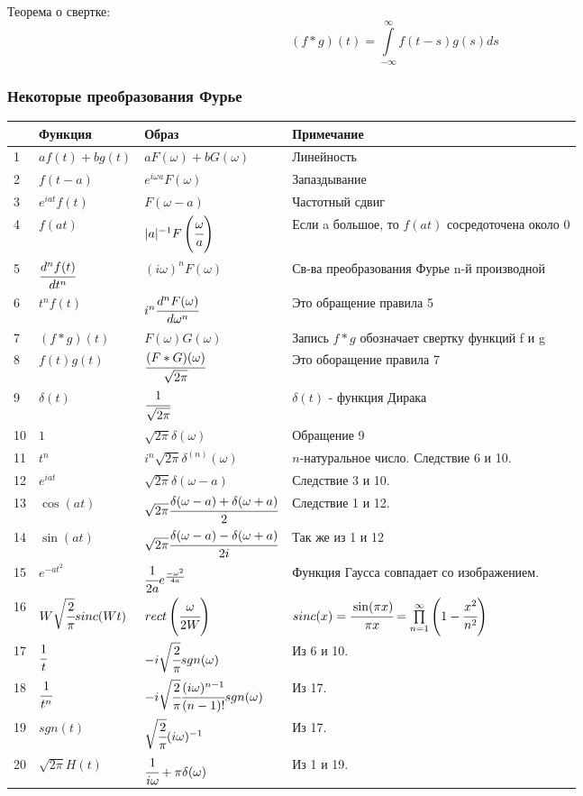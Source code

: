 \documentclass[12pt, a6paper]{extarticle}
\begin{document}
Теорема о свертке:
$$ (f * g)(t) = \int\limits_{-\infty}^{\infty}{ f(t-s)g(s) ds} $$

\subsubsection{Некоторые преобразования Фурье}
\begin{tabular}[c]{|p{0.3cm}|p{2.8cm}|p{4.5cm}|p{8cm}|}
\hline
 &Функция & Образ & Примечание \\ \hline
1 & $ a f(t) + b g(t)$ & $aF(\omega)+bG(\omega)$ & Линейность \\ \hline
2 & $ f(t-a)$ & $e^{i\omega a}F(\omega)$ & Запаздывание \\ \hline
3 & $ e^{iat}f(t)$ & $F(\omega-a)$ & Частотный сдвиг \\ \hline
4 & $ f(at)$ & $ |a|^{-1}F\left( \cfrac{\omega}{a} \right) $ & Если a большое, то $f(at)$ сосредоточена около 0 \\ \hline
5 & $ \cfrac{d^nf(t)}{dt^n} $ & $ (i\omega)^nF(\omega) $ & Св-ва преобразования Фурье n-й производной \\ \hline
6 & $ t^n f(t) $ & $ i^n \cfrac{d^nF(\omega)}{d\omega^n} $ & Это обращение правила 5 \\ \hline
7 & $ (f * g)(t)$ & $ F(\omega)G(\omega) $ & Запись $f*g$ обозначает свертку функций f и g \\ \hline
8 & $ f(t)g(t)$ & $ \cfrac{(F * G)(\omega)}{\sqrt{2\pi}} $ & Это оборащение правила 7 \\ \hline
9 & $ \delta(t) $ & $ \cfrac{1}{\sqrt{2\pi}} $ & $ \delta(t) $ - функция Дирака \\ \hline
10 & $ 1 $ & $ \sqrt{2\pi}\delta(\omega) $ & Обращение 9 \\ \hline
11 & $ t^n $ & $ i^n \sqrt{2\pi} \delta^{(n)}(\omega) $ & $n$-натуральное число. Следствие 6 и 10. \\ \hline
12 & $ e^{iat} $ & $ \sqrt{2\pi}\delta(\omega-a) $  & Следствие 3 и 10.\\ \hline
13 & $ \cos(at) $ & $ \sqrt{2\pi} \cfrac{\delta(\omega-a)+\delta(\omega+a)}{2} $ & Следствие 1 и 12.\\ \hline
14 & $ \sin(at) $ & $ \sqrt{2\pi} \cfrac{\delta(\omega-a)-\delta(\omega+a)}{2i} $ & Так же из 1 и 12\\ \hline
15 & $ e^{-at^2} $ & $ \cfrac{1}{2a} e^{\frac{-\omega^2}{4a}} $ & Функция Гаусса совпадает со  изображением.\\ \hline
16 & $ W\sqrt{\cfrac{2}{\pi}}sinc(Wt) $ & $ rect\left( \cfrac{\omega}{2W} \right) $ & $ sinc(x) = \cfrac{\sin(\pi x)}{\pi x} = \prod\limits^{\infty}_{n=1}{ \left( 1 - \cfrac{x^2}{n^2} \right) }$\\ \hline
17 & $ \cfrac{1}{t} $ & $ -i \sqrt{\cfrac{2}{\pi}} sgn(\omega) $ & Из 6 и 10.\\ \hline
18 & $ \cfrac{1}{t^n} $ & $ -i\sqrt{\cfrac{2}{\pi}} \cfrac{(i\omega)^{n-1}}{(n-1)!} sgn(\omega) $ &  Из 17.\\ \hline
19 & $ sgn(t) $ & $ \sqrt{\cfrac{2}{\pi}}(i\omega)^{-1} $ & Из 17.\\ \hline
20 & $ \sqrt{2\pi}H(t) $ & $ \cfrac{1}{i\omega}+\pi \delta(\omega) $ & Из 1 и 19.\\ 
\hline
\end{tabular}
\end{document}

